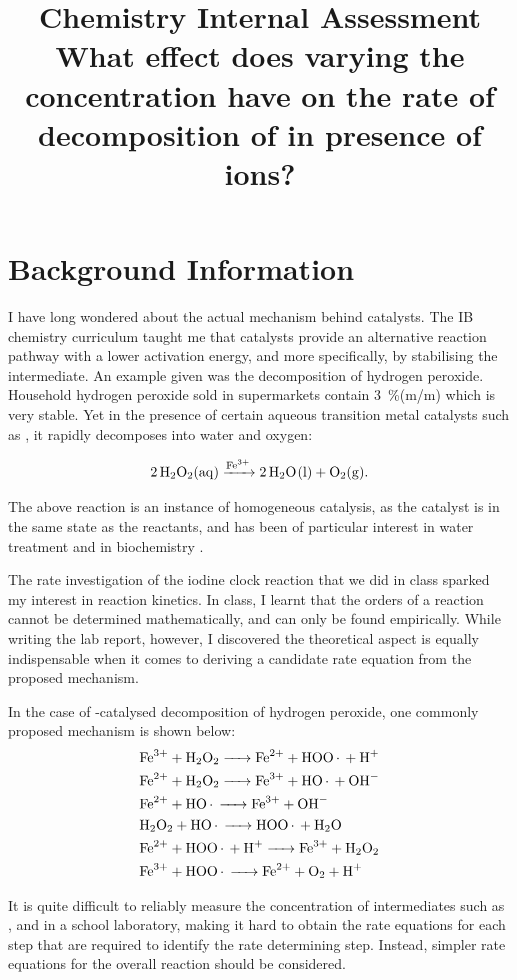 \documentclass[a4paper, 12pt]{article}
\title{
\textbf{Chemistry Internal Assessment}\\
\bigskip
What effect does varying the concentration have on the rate of decomposition of \ce{H2O2} in presence of \ce{Fe^3+} ions?
}
\author{}
\date{}
\begin{document}
\maketitle

\section*{Background Information}
I have long wondered about the actual mechanism behind catalysts. The IB chemistry curriculum taught me that catalysts provide an alternative reaction pathway with a lower activation energy, and more specifically, by stabilising the intermediate. An example given was the decomposition of hydrogen peroxide. Household hydrogen peroxide sold in supermarkets contain \SI{3}{\%}(m/m)  which is very stable. Yet in the presence of certain aqueous transition metal catalysts such as , it rapidly decomposes into water and oxygen:

\[ \ce{2 H2O2(aq) ->[Fe^3+] 2 H2O(l) + O2(g)}. \]

The above reaction is an instance of homogeneous catalysis, as the catalyst is in the same state as the reactants, and has been of particular interest in water treatment and in biochemistry \cite{de_laat}.

The rate investigation of the iodine clock reaction that we did in class sparked my interest in reaction kinetics. In class, I learnt that the orders of a reaction cannot be determined mathematically, and can only be found empirically. While writing the lab report, however, I discovered the theoretical aspect is equally indispensable when it comes to deriving a candidate rate equation from the proposed mechanism. 

In the case of -catalysed decomposition of hydrogen peroxide, one commonly proposed mechanism \cite{mechanism} is shown below:
\begin{align*}
    \ce{&Fe^3+ + H2O2 -> Fe^2+ + HOO. + H+}\\
    \ce{&Fe^2+ + H2O2 -> Fe^3+ + HO. + OH-}\\
    \ce{&Fe^2+ + HO.  -> Fe^3+ + OH-}\\
    \ce{&H2O2 + HO.   -> HOO. + H2O}\\
    \ce{&Fe^2+ + HOO. + H+ -> Fe^3+ + H2O2}\\
    \ce{&Fe^3+ + HOO. -> Fe^2+ + O2 + H+}
\end{align*}

It is quite difficult to reliably measure the concentration of intermediates such as ,  and  in a school laboratory, making it hard to obtain the rate equations for each step that are required to identify the rate determining step. Instead, simpler rate equations for the overall reaction should be considered.
\end{document}

